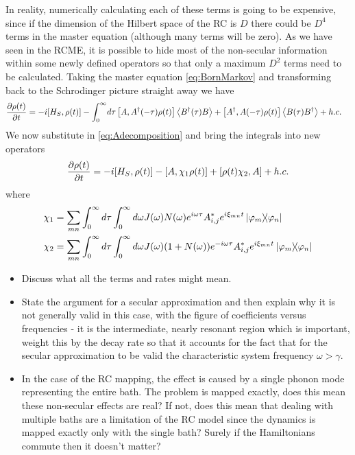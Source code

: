 \documentclass[]{article}
\begin{document}
In reality, numerically calculating each of these terms is going to be expensive, since if the dimension of the Hilbert space of the RC is $D$ there could be $D^4$ terms in the master equation (although many terms will be zero). As we have seen in the RCME, it is possible to hide most of the non-secular information within some newly defined operators so that only a maximum $D^2$ terms need to be calculated. Taking the master equation \ref{eq:BornMarkov} and transforming back to the Schrodinger picture straight away we have
\begin{align}
	\begin{split}
		\label{eq:BornMarkovSchrod}
		\pdv{\rho(t)}{t} = -i[H_S, \rho(t)] - \int_{0}^{\infty}& d\tau  \left[A, A^{\dagger}(-\tau)\rho(t)\right] \expval{B^{\dagger}(\tau)B} + \left[A^{\dagger},A(-\tau)\rho(t)\right] \expval{B(\tau)B^{\dagger}} + h.c.
	\end{split}
\end{align}
We now substitute in \ref{eq:Adecomposition} and bring the integrals into new operators
\begin{align}
	\begin{split}
		\pdv{\rho(t)}{t} = -i[H_S, \rho(t)] - \left[A, \chi_1 \rho(t)\right]  + \left[\rho(t)\chi_2,A\right] + h.c.
	\end{split}
\end{align}
where 
\begin{align}
	\begin{split}
\chi_1 &= \sum_{m n}\int_{0}^{\infty}d\tau\int_{0}^{\infty}d\omega J(\omega)N(\omega)e^{i\omega\tau}A_{i,j}^* e^{i\xi_{mn}t}\dyad{\varphi_m}{\varphi_n} \\
\chi_2 &= \sum_{m n}\int_{0}^{\infty}d\tau\int_{0}^{\infty}d\omega J(\omega)(1+N(\omega))e^{-i\omega\tau}A_{i,j}^* e^{i\xi_{mn}t}\dyad{\varphi_m}{\varphi_n} 
	\end{split}
\end{align}

\begin{itemize}
	\item Discuss what all the terms and rates might mean.
	\item State the argument for a secular approximation and then explain why it is not generally valid in this case, with the figure of coefficients versus frequencies - it is the intermediate, nearly resonant region which is important, weight this by the decay rate so that it accounts for the fact that for the secular approximation to be valid the characteristic system frequency $\omega>\gamma$.
	\item In the case of the RC mapping, the effect is caused by a single phonon mode representing the entire bath. The problem is mapped exactly, does this mean these non-secular effects are real? If not, does this mean that dealing with multiple baths are a limitation of the RC model since the dynamics is mapped exactly only with the single bath? Surely if the Hamiltonians commute then it doesn't matter?
\end{itemize}
\end{document}
